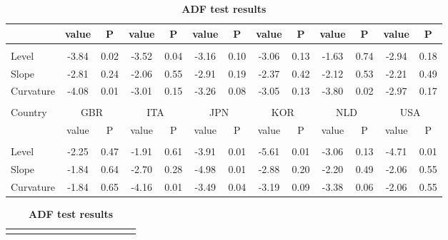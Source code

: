 \documentclass[12pt,bibliography=totoc]{article}
\begin{document}
\begin{appendices}
\begin{table}[H]
\begin{subtable}[t]{1\textwidth}
\begin{tabular}{l cc cc cc cc cc cc}
& value &P 		& value &P 			& value &P  		& value& P         			& value &P				& value &P\\

\hline       \\ [-1.5ex] 

Level		&	-3.84 & 0.02 		& -3.52 & 0.04 		& -3.16 & 0.10 		& -3.06 & 0.13 		& -1.63 & 0.74 		& -2.94 & 0.18	\\
Slope		&	-2.81 & 0.24 		& -2.06 & 0.55 		& -2.91 & 0.19 		& -2.37 & 0.42 		& -2.12 & 0.53 		& -2.21 & 0.49	\\
Curvature	&	-4.08 & 0.01 		& -3.01 & 0.15 		& -3.26 & 0.08 		& -3.05 & 0.13  		& -3.80 & 0.02 		& -2.97 & 0.17\\

\hline   \\ [-1.5ex]    

Country	&	\multicolumn{2}{c}{GBR}			&	\multicolumn{2}{c}{ITA}			&	\multicolumn{2}{c}{JPN}			&	\multicolumn{2}{c}{KOR}			&	\multicolumn{2}{c}{NLD}			&	\multicolumn{2}{c}{USA}			\\

 & value &P & value &P& value &P & value &P& value &P & value &P\\

\hline       \\ [-1.5ex] 

Level		&	-2.25 & 0.47 		& -1.91 & 0.61 		& -3.91 & 0.01 		& -5.61 & 0.01 		& -3.06 & 0.13 		& -4.71 & 0.01	\\
Slope		&	-1.84 & 0.64		& -2.70 & 0.28		& -4.98 & 0.01 		& -2.88 & 0.20 		& -2.20 & 0.49 		& -2.06 & 0.55	\\
Curvature	&	-1.84 & 0.65 		& -4.16 & 0.01 		& -3.49 & 0.04 		& -3.19 & 0.09 		& -3.38 & 0.06 		& -2.06 & 0.55\\
\hline
\end{tabular}
\caption{\textbf{ADF test results}}
\end{subtable}
\hspace{\fill}
\bigskip 

\begin{subtable}[t]{1\textwidth}
\centering%
\begin{tabular}{l cc cc cc cc cc cc}%
\hline\hline \\ [-1.5ex]                         %


\end{tabular}
\end{subtable}
\end{table}
\end{appendices}
\end{document}
